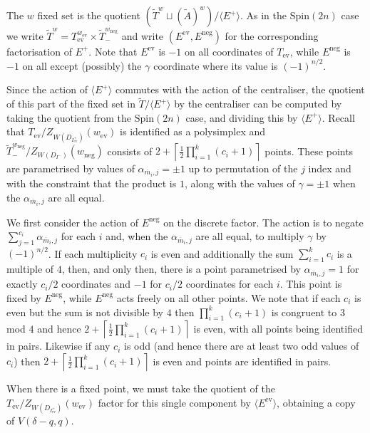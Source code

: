 \documentclass[11pt,a4paper]{article}
\def\Spin{\mathrm{Spin}}
\def\Atilde{(\widetilde{A})}
\def\mbar{\overline{m}}
\def\mbar{\overline{m}}
\def\coveringtorus{\tilde{T}}
\def\ev{\mathrm{ev}}
\def\neg{\mathrm{neg}}
\begin{document}
The $w$ fixed set is the quotient $(\coveringtorus^w \sqcup \Atilde^w)/\langle E^+\rangle$. As in the $\Spin(2n)$ case we write $\coveringtorus^w=T_{\ev}^{w_\ev}\times \coveringtorus_-^{w_\neg}$ and write $(E^\ev,E^\neg)$ for the corresponding factorisation of $E^+$. Note that $E^\ev$ is $-1$ on all coordinates of $T_\ev$, while $E^\neg$ is $-1$ on all except (possibly) the $\gamma$ coordinate where its value is $(-1)^{n/2}$.

Since the action of $\langle E^+\rangle$ commutes with the action of the centraliser, the quotient of this part of the fixed set in $\coveringtorus/\langle E^+\rangle$ by the centraliser can be computed by taking the quotient from the $\Spin(2n)$ case, and dividing this by $\langle E^+\rangle$. Recall that $T_{\ev}/Z_{W(D_{I^+_{\ev}})}(w_{\ev})$ is identified as a polysimplex and $\coveringtorus_-^{w_\neg}/ Z_{W(D_{I^-})}(w_\neg)$ consists of $2+\left\lceil\frac 12\prod_{i=1}^k (c_i+1) \right\rceil$ points. These points are parametrised by values of $\alpha_{\mbar_i,j}=\pm 1$ up to permutation of the $j$ index and with the constraint that the product is $1$,  along with the values of $\gamma=\pm1$ when the $\alpha_{\mbar_i,j}$ are all equal.

We first consider the action of $E^\neg$ on the discrete factor. The action is to negate $\sum_{j=1}^{c_i}\alpha_{\mbar_i,j}$ for each $i$ and, when the $\alpha_{\mbar_i,j}$ are all equal, to multiply $\gamma$ by $(-1)^{n/2}$. If each multiplicity $c_i$ is even and additionally the sum $\sum_{i=1}^kc_i$ is a multiple of $4$, then, and only then, there is a point parametrised by $\alpha_{\mbar_i,j}=1$ for exactly $c_i/2$ coordinates and $-1$ for $c_i/2$ coordinates for each $i$. This point is fixed by $E^\neg$, while $E^\neg$ acts freely on all other points. We note that if each $c_i$ is even but the sum is not divisible by $4$ then $\prod_{i=1}^k (c_i+1)$ is congruent to $3$ mod $4$ and hence $2+\left\lceil\frac 12\prod_{i=1}^k (c_i+1) \right\rceil$ is even, with all points being identified in pairs. 
Likewise if any $c_i$ is odd (and hence there are at least two odd values of $c_i$) then $2+\left\lceil\frac 12\prod_{i=1}^k (c_i+1) \right\rceil$ is even and points are identified in pairs.

When there is a fixed point, we must take the quotient of the $T_{\ev}/Z_{W(D_{I^+_{\ev}})}(w_{\ev})$ factor for this single component by $\langle E^\ev\rangle$, obtaining a copy of $V(\delta-q,q)$.

\bigskip
\end{document}
